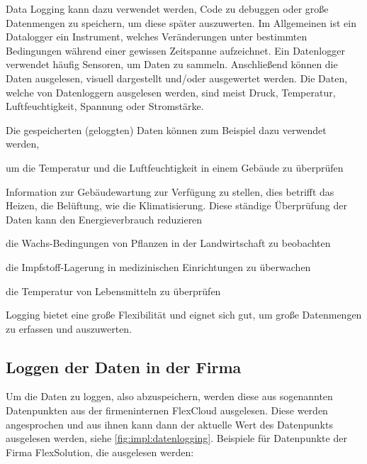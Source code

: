 
Data Logging kann dazu verwendet werden, Code zu debuggen oder große Datenmengen zu speichern, um diese später auszuwerten. Im Allgemeinen ist ein Datalogger ein Instrument, welches Veränderungen unter bestimmten Bedingungen während einer gewissen Zeitspanne aufzeichnet. Ein Datenlogger verwendet häufig Sensoren, um Daten zu sammeln. Anschließend können die Daten ausgelesen, visuell dargestellt und/oder ausgewertet werden. Die Daten, welche von Datenloggern ausgelesen werden, sind meist Druck, Temperatur, Luftfeuchtigkeit, Spannung oder Stromstärke. \cite{DataLogging} 

Die gespeicherten (geloggten) Daten können zum Beispiel dazu verwendet werden, 

\begin{compactitem}
    \item um die Temperatur und die Luftfeuchtigkeit in einem Gebäude zu überprüfen
    \item Information zur Gebäudewartung zur Verfügung zu stellen, dies betrifft das Heizen, die Belüftung, wie die Klimatisierung. Diese ständige Überprüfung der Daten kann den Energieverbrauch reduzieren
    \item die Wachs-Bedingungen von Pflanzen in der Landwirtschaft zu beobachten
    \item die Impfstoff-Lagerung in medizinischen Einrichtungen zu überwachen
    \item die Temperatur von Lebensmitteln zu überprüfen
\end{compactitem}
\cite{DataLogging}

Logging bietet eine große Flexibilität und eignet sich gut, um große Datenmengen zu erfassen und auszuwerten. \cite{BigDataBuch}

\subsection{Loggen der Daten in der Firma}
Um die Daten zu loggen, also abzuspeichern, werden diese aus sogenannten Datenpunkten aus der firmeninternen FlexCloud ausgelesen. Diese werden angesprochen und aus ihnen kann dann der aktuelle Wert des Datenpunkts ausgelesen werden, siehe \ref{fig:impl:datenlogging}.
Beispiele für Datenpunkte der Firma FlexSolution, die ausgelesen werden: 

